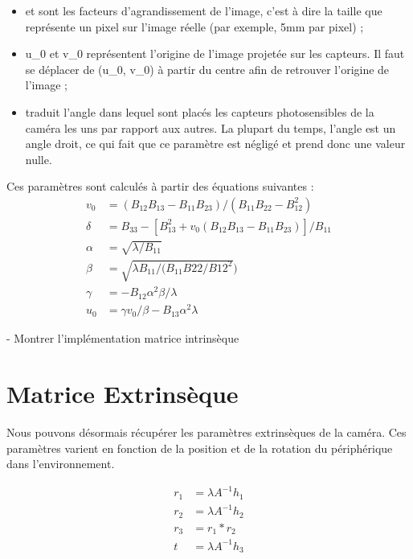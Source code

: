 \documentclass{article}
\begin{document}
\begin{itemize}
\item \alpha et \beta sont les facteurs d'agrandissement de l'image, c'est à dire la taille que représente un pixel sur l'image réelle (par exemple, 5mm par pixel) ;
\item u_0 et v_0 représentent l'origine de l'image projetée sur les capteurs. Il faut se déplacer de (u_0, v_0) à partir du centre afin de retrouver l'origine de l'image ;
\item \gamma traduit l'angle dans lequel sont placés les capteurs photosensibles de la caméra les uns par rapport aux autres. La plupart du temps, l'angle est un angle droit, ce qui fait que ce paramètre est négligé et prend donc une valeur nulle.
\end{itemize}

Ces paramètres sont calculés à partir des équations suivantes :
\begin{equation}
  \begin{aligned}
    v_0 &= (B_{12}B_{13} - B_{11}B_{23}) / (B_{11}B_{22} -B_{12}^2) \\
    \delta &= B_{33} - [B_{13}^2 + v_0(B_{12}B_{13} - B_{11}B_{23})] / B_{11} \\
    \alpha &= \sqrt{\lambda/B_{11}} \\
    \beta &= \sqrt{\lambda B_{11}/(B_{11}B{22}/B{12}^2}) \\
    \gamma &= -B_{12}\alpha^2\beta/\lambda \\
    u_0 &= \gamma v_0 /\beta - B_{13}\alpha^2\lambda
  \end{aligned}
\end{equation}

- Montrer l'implémentation matrice intrinsèque


\section{Matrice Extrinsèque}
Nous pouvons désormais récupérer les paramètres extrinsèques de la caméra.
Ces paramètres varient en fonction de la position et de la rotation du périphérique dans l'environnement.

\begin{equation}
  \begin{aligned}
    r_1 &= \lambda A^{-1} h_1 \\
    r_2 &= \lambda A^{-1} h_2 \\
    r_3 &= r_1 * r_2 \\
    t &= \lambda A^{-1} h_3
  \end{aligned}
\end{equation}
\end{document}
